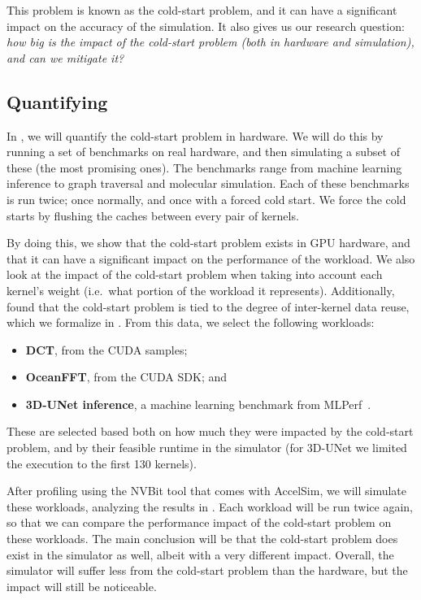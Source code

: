 This problem is known as the cold-start problem, and it can have a significant impact on the accuracy of the simulation.
It also gives us our research question: \textit{how big is the impact of the cold-start problem (both in hardware and simulation), and can we mitigate it?}

\subsection{Quantifying}\label{subsec:quantifying}
In , we will quantify the cold-start problem in hardware.
We will do this by running a set of benchmarks on real hardware, and then simulating a subset of these (the most promising ones).
The benchmarks range from machine learning inference to graph traversal and molecular simulation.
Each of these benchmarks is run twice; once normally, and once with a forced cold start.
We force the cold starts by flushing the caches between every pair of kernels.

By doing this, we show that the cold-start problem exists in GPU hardware, and that it can have a significant impact on the performance of the workload.
We also look at the impact of the cold-start problem when taking into account each kernel's weight (i.e.\ what portion of the workload it represents).
Additionally, found that the cold-start problem is tied to the degree of inter-kernel data reuse, which we formalize in .
From this data, we select the following workloads:
\begin{itemize}
    \item \textbf{DCT}, from the CUDA samples;
    \item \textbf{OceanFFT}, from the CUDA SDK; and
    \item \textbf{3D-UNet inference}, a machine learning benchmark from MLPerf~\cite{mlperf}.
\end{itemize}
These are selected based both on how much they were impacted by the cold-start problem, and by their feasible runtime in the simulator (for 3D-UNet we limited the execution to the first 130 kernels).

After profiling using the NVBit tool that comes with AccelSim, we will simulate these workloads, analyzing the results in .
Each workload will be run twice again, so that we can compare the performance impact of the cold-start problem on these workloads.
The main conclusion will be that the cold-start problem does exist in the simulator as well, albeit with a very different impact.
Overall, the simulator will suffer less from the cold-start problem than the hardware, but the impact will still be noticeable.

